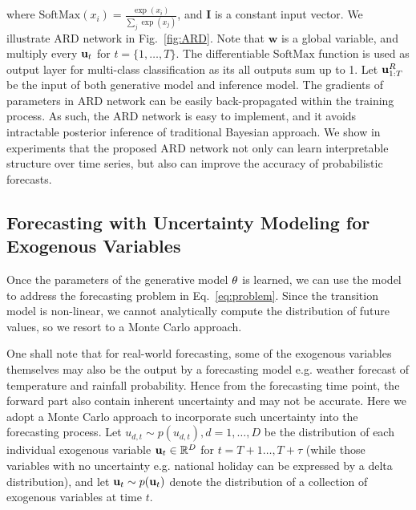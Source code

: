 \documentclass{article}
\begin{document}
where $\text{SoftMax}(x_i)=\frac{\exp(x_i)}{\sum_j\exp(x_j)}$, and $\mathbf{I}$ is a constant input vector. We illustrate ARD network in Fig.~\ref{fig:ARD}. Note that $\mathbf{w}$ is a global variable, and multiply every $\mathbf{u}_t$ for $t=\{1,\dots,T\}$. The differentiable $\text{SoftMax}$ function is used as output layer for multi-class classification as its all outputs sum up to 1. Let $\mathbf{u}_{1:T}^{R}$ be the input of both generative model and inference model. The gradients of parameters in ARD network can be easily back-propagated within the training process. As such, the ARD network is easy to implement, and it avoids intractable posterior inference of traditional Bayesian approach. We show in experiments that the proposed ARD network not only can learn interpretable structure over time series, but also can improve the accuracy of probabilistic forecasts.

\subsection{Forecasting with Uncertainty Modeling for Exogenous Variables}
Once the parameters of the generative model $\theta_{}$ is learned, we can use the model to address the forecasting problem in Eq.~\ref{eq:problem}. Since the transition model is non-linear, we cannot analytically compute the distribution of future values, so we resort to a Monte Carlo approach.

One shall note that for real-world forecasting, some of the exogenous variables themselves may also be the output by a forecasting model e.g. weather forecast of temperature and rainfall probability. Hence from the forecasting time point, the forward part also contain inherent uncertainty and may not be accurate. Here we adopt a Monte Carlo approach to incorporate such uncertainty into the forecasting process. Let $u_{d,t}\sim p(u_{d,t}), d=1,\dots,D$ be the distribution of each individual exogenous variable $\mathbf{u}_t\in \mathbb{R}^D$ for $t=T+1\dots,T+\tau$ (while those variables with no uncertainty e.g. national holiday can be expressed by a delta distribution), and let $\mathbf{u}_t\sim p(\mathbf{u}_t)$ denote the distribution of a collection of exogenous variables at time $t$.
\end{document}
